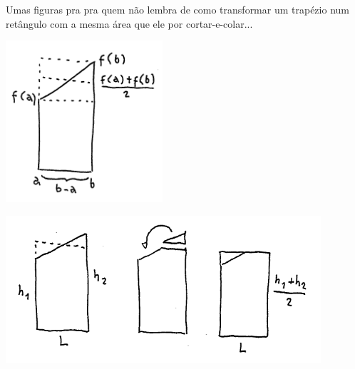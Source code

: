 \documentclass[oneside,12pt]{article}
\begin{document}
Umas figuras pra pra quem não lembra de como transformar um trapézio
num retângulo com a mesma área que ele por cortar-e-colar...

\msk

\includegraphics[height=6cm]{2020-2-C2/20210205_trapezios_1.pdf}

\newpage

\includegraphics[height=5.5cm]{2020-2-C2/20210205_trapezios_3.pdf}

















\end{document}
